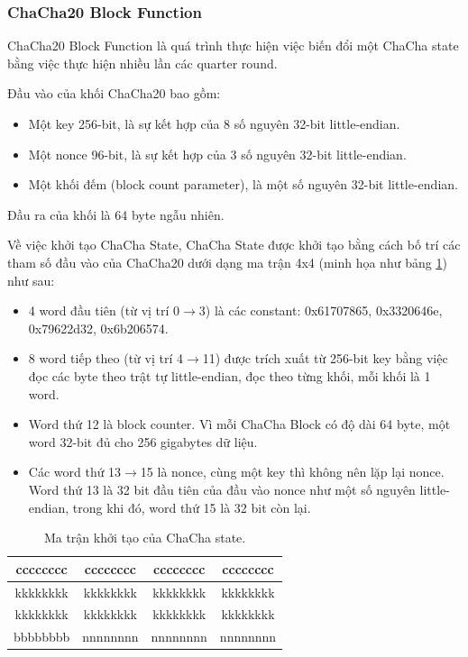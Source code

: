 \subsubsection{ChaCha20 Block Function}

ChaCha20 Block Function là quá trình thực hiện việc biến đổi một ChaCha state bằng việc thực hiện nhiều lần các quarter round.

Đầu vào của khối ChaCha20 bao gồm:
\begin{itemize}
    \item Một key 256-bit, là sự kết hợp của 8 số nguyên 32-bit little-endian.
    \item Một nonce 96-bit, là sự kết hợp của 3 số nguyên 32-bit little-endian.
    \item Một khối đếm (block count parameter), là một số nguyên 32-bit little-endian.
\end{itemize}

Đầu ra của khối là 64 byte ngẫu nhiên.

Về việc khởi tạo ChaCha State, ChaCha State được khởi tạo bằng cách bố trí các tham số đầu vào của ChaCha20 dưới dạng ma trận 4x4 (minh họa như bảng \ref{tab:Init-CC20-State}) như sau:

\begin{itemize}
    \item 4 word đầu tiên (từ vị trí 0$\rightarrow$3) là các constant: 0x61707865, 0x3320646e, 0x79622d32, 0x6b206574.
    \item 8 word tiếp theo (từ vị trí 4$\rightarrow$11) được trích xuất từ 256-bit key bằng việc đọc các byte theo trật tự little-endian, đọc theo từng khối, mỗi khối là 1 word.
    \item Word thứ 12 là block counter. Vì mỗi ChaCha Block có độ dài 64 byte, một word 32-bit đủ cho 256 gigabytes dữ liệu. %
    \item Các word thứ 13$\rightarrow$15 là nonce, cùng một key thì không nên lặp lại nonce. Word thứ 13 là 32 bit đầu tiên của đầu vào nonce như một số nguyên little-endian, trong khi đó, word thứ 15 là 32 bit còn lại.
\end{itemize}

\begin{table}[ht]
\caption{Ma trận khởi tạo của ChaCha state.}

\label{tab:Init-CC20-State}%
\begin{center}
\begin{tabular}{|c|c|c|c|}
\hline
cccccccc & cccccccc & cccccccc & cccccccc \\ \hline
kkkkkkkk & kkkkkkkk & kkkkkkkk & kkkkkkkk \\ \hline
kkkkkkkk & kkkkkkkk & kkkkkkkk & kkkkkkkk \\ \hline
bbbbbbbb & nnnnnnnn & nnnnnnnn & nnnnnnnn \\ \hline
\end{tabular}
\end{center}
\end{table}

